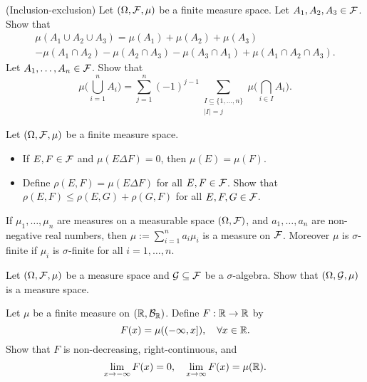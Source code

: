 \begin{problem}(Inclusion-exclusion) Let $(\Omega,\mathcal F,\mu)$ be a finite measure space. Let $A_1,A_2,A_3\in \mathcal F$. Show that
\begin{multline*}
    \mu(A_1\cup A_2 \cup A_3) = \mu(A_1) + \mu(A_2) + \mu(A_3) \\- \mu(A_1\cap A_2) - \mu(A_2\cap A_3) - \mu(A_3\cap A_1) + \mu(A_1\cap A_2\cap A_3).   
\end{multline*}
Let $A_1,\ldots,A_n\in \mathcal F$. Show that 
\begin{equation*}
    \mu\Big(\bigcup_{i=1}^n A_i \Big) = \sum_{j=1}^n (-1)^{j-1} \sum_{\substack{I\subseteq \{1,\ldots,n\}\\ |I| = j}} \mu\Big(\bigcap_{i\in I} A_i\Big).
\end{equation*}
\end{problem}

\begin{problem}
    Let $(\Omega,\mathcal F,\mu)$ be a finite measure space.
    \begin{itemize}
        \item If $E,F\in \mathcal F$ and $\mu(E\Delta F) =0$, then $\mu(E) = \mu(F)$.
        \item Define $\rho(E,F) = \mu(E\Delta F)$ for all $E,F\in \mathcal F$. Show that $\rho(E,F) \leq \rho(E,G)+\rho(G,F)$ for all $E,F,G\in \mathcal F$.
    \end{itemize}
\end{problem}

\begin{problem} If $\mu_1,\ldots ,\mu_n$ are measures on a measurable space $(\Omega,\mathcal F)$, and $a_1,\ldots, a_n$ are non-negative real numbers, then $\mu:=\sum_{i=1}^n a_i \mu_i$ is a measure on $\mathcal F$. Moreover $\mu$ is $\sigma$-finite if $\mu_i$ is $\sigma$-finite for all $i=1,\ldots,n$. 
\end{problem}



\begin{problem}
    Let $(\Omega,\mathcal F,\mu)$ be a measure space and $\mathcal G\subseteq \mathcal F$ be a $\sigma$-algebra. Show that $(\Omega,\mathcal G,\mu)$ is a measure space.
\end{problem}

\begin{problem}
    Let $\mu$ be a finite measure on $(\mathbb R,\mathcal B_{\mathbb R})$. Define $F:\mathbb R\to\mathbb R$ by 
    \begin{equation*}
        F(x) = \mu((-\infty,x]), \quad \forall x\in \mathbb R.
    \end{equation*}
    Show that $F$ is non-decreasing, right-continuous, and 
    \begin{equation*}
        \lim_{x\to-\infty} F(x) = 0,\quad \lim_{x\to\infty} F(x) = \mu(\mathbb R).
    \end{equation*}
\end{problem} 

